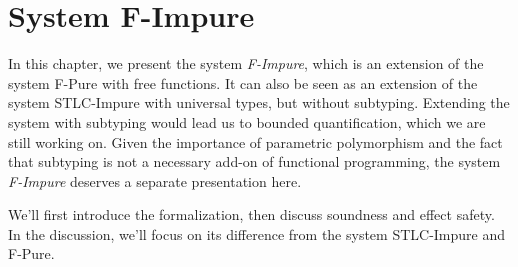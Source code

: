 \section{System F-Impure}

In this chapter, we present the system \emph{F-Impure}, which is an
extension of the system F-Pure with free functions. It can also be
seen as an extension of the system STLC-Impure with universal types,
but without subtyping. Extending the system with subtyping would lead
us to bounded quantification, which we are still working on. Given the
importance of parametric polymorphism and the fact that subtyping is
not a necessary add-on of functional programming, the system
\emph{F-Impure} deserves a separate presentation here.

We'll first introduce the formalization, then discuss soundness and
effect safety. In the discussion, we'll focus on its difference from
the system STLC-Impure and F-Pure.

